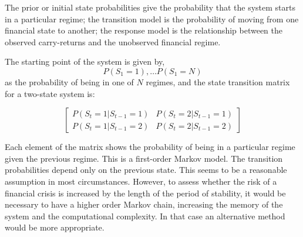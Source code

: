 \documentclass[12pt, a4paper, oneside]{article}\usepackage[]{graphicx}\usepackage[]{color}
\begin{document}
The prior or initial state probabilities give the probability that the system starts in a particular regime; the transition model is the probability of moving from one financial state to another; the response model is the relationship between the observed carry-returns and the unobserved financial regime.  

The starting point of the system is given by,
\begin{equation*}
P(S_1 = 1), \dots P(S_1 = N)
\end{equation*}
as the probability of being in one of $N$ regimes, and the state transition matrix for a two-state system is:

\begin{equation*}
\begin{bmatrix}
P(S_t = 1|S_{t-1}=1)  & P(S_t = 2|S_{t-1}=1)\\
P(S_t = 1|S_{t-1}=2)  & P(S_t = 2|S_{t-1}=2)
\end{bmatrix}
\end{equation*}

  Each element of the matrix shows the probability of being in a particular regime given the previous regime. This is a first-order Markov model.  The transition probabilities depend only on the previous state. This seems to be a reasonable assumption in most circumstances.  However, to assess whether the risk of a financial crisis is increased by the length of the period of stability, it would be necessary to have a higher order Markov chain, increasing the memory of the system and the computational complexity.  In that case an alternative method would be more appropriate. 
\end{document}
